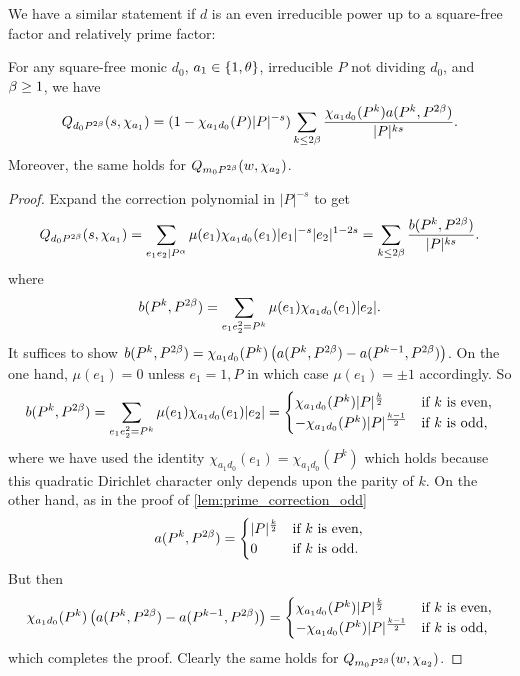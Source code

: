 \documentclass[12pt,reqno,oneside]{amsart}
\begin{document}
    We have a similar statement if $d$ is an even irreducible power up to a square-free factor and relatively prime factor:
    
    \begin{lemma}\label{lem:prime_correction_even}
        For any square-free monic $d_{0}$, $a_{1} \in \{1,\theta\}$, irreducible $P$ not dividing $d_{0}$, and $\beta \ge 1$, we have
        \[
            Q_{d_{0}P^{2\beta}}(s,\chi_{a_{1}}) = (1-\chi_{a_{1}d_{0}}(P)|P|^{-s})\sum_{k \le 2\beta}\frac{\chi_{a_{1}d_{0}}(P^{k})a(P^{k},P^{2\beta})}{|P|^{ks}}.
        \]
        Moreover, the same holds for $Q_{m_{0}P^{2\beta}}(w,\chi_{a_{2}})$.
    \end{lemma}
    \begin{proof}
        Expand the correction polynomial in $|P|^{-s}$ to get
        \[
            Q_{d_{0}P^{2\beta}}(s,\chi_{a_{1}}) = \sum_{e_{1}e_{2} \mid P^{\alpha}}\mu(e_{1})\chi_{a_{1}d_{0}}(e_{1})|e_{1}|^{-s}|e_{2}|^{1-2s} = \sum_{k \le 2\beta}\frac{b(P^{k},P^{2\beta})}{|P|^{ks}}.
        \]
        where
        \[
            b(P^{k},P^{2\beta}) = \sum_{e_{1}e_{2}^{2} = P^{k}}\mu(e_{1})\chi_{a_{1}d_{0}}(e_{1})|e_{2}|.
        \]
        It suffices to show $b(P^{k},P^{2\beta}) = \chi_{a_{1}d_{0}}(P^{k})\left(a(P^{k},P^{2\beta})-a(P^{k-1},P^{2\beta})\right)$. On the one hand, $\mu(e_{1}) = 0$ unless $e_{1} = 1,P$ in which case $\mu(e_{1}) = \pm1$ accordingly. So
        \[
            b(P^{k},P^{2\beta}) = \sum_{e_{1}e_{2}^{2} = P^{k}}\mu(e_{1})\chi_{a_{1}d_{0}}(e_{1})|e_{2}| = \begin{cases} \chi_{a_{1}d_{0}}(P^{k})|P|^{\frac{k}{2}} & \text{if $k$ is even}, \\ -\chi_{a_{1}d_{0}}(P^{k})|P|^{\frac{k-1}{2}} & \text{if $k$ is odd}, \end{cases}
        \]
        where we have used the identity $\chi_{a_{1}d_{0}}(e_{1}) = \chi_{a_{1}d_{0}}(P^{k})$ which holds because this quadratic Dirichlet character only depends upon the parity of $k$. On the other hand, as in the proof of \cref{lem:prime_correction_odd} 
        \[
            a(P^{k},P^{2\beta}) = \begin{cases} |P|^{\frac{k}{2}} & \text{if $k$ is even}, \\ 0 & \text{if $k$ is odd}. \end{cases}
        \]
        But then
        \[
            \chi_{a_{1}d_{0}}(P^{k})\left(a(P^{k},P^{2\beta})-a(P^{k-1},P^{2\beta})\right) = \begin{cases} \chi_{a_{1}d_{0}}(P^{k})|P|^{\frac{k}{2}} & \text{if $k$ is even}, \\ -\chi_{a_{1}d_{0}}(P^{k})|P|^{\frac{k-1}{2}} & \text{if $k$ is odd}, \end{cases}
        \]
        which completes the proof. Clearly the same holds for $Q_{m_{0}P^{2\beta}}(w,\chi_{a_{2}})$.
    \end{proof}
\end{document}
